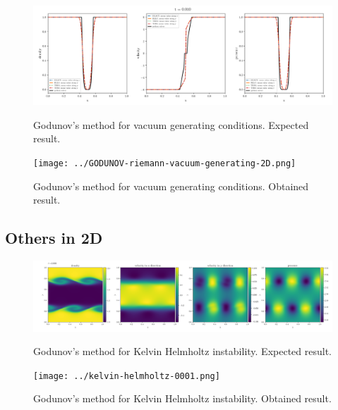     \begin{figure}[htbp]
        \centering
        \includegraphics[width=.9\textwidth]{./figures/GODUNOV-riemann-vacuum-generating-2D.png}%
        \caption{Godunov's method for vacuum generating conditions. Expected result.}
        \texttt{[image: ../GODUNOV-riemann-vacuum-generating-2D.png]}%
        \caption{Godunov's method for vacuum generating conditions. Obtained result.}
    \end{figure}







\clearpage
\subsection{Others in 2D}

    \begin{figure}[htbp]
        \centering
        \includegraphics[width=.9\textwidth]{./figures/kelvin-helmholtz-0001.png}%
        \caption{Godunov's method for Kelvin Helmholtz instability. Expected result.}
        \texttt{[image: ../kelvin-helmholtz-0001.png]}%
        \caption{Godunov's method for Kelvin Helmholtz instability. Obtained result.}
    \end{figure}





